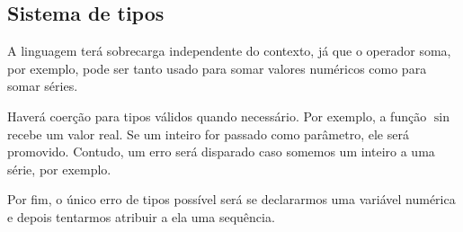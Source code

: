 \documentclass[a4 paper, 12pt]{article}
\begin{document}
\subsection{Sistema de tipos}
A linguagem ter\'a sobrecarga independente do contexto, j\'a que o
operador soma, por exemplo, pode ser tanto usado para somar valores
num\'ericos como para somar s\'eries.

Haver\'a coer\c c\~ao para tipos v\'alidos quando necess\'ario. Por
exemplo, a fun\c c\~ao $\sin$ recebe um valor real. Se um inteiro for
passado como par\^ametro, ele ser\'a promovido. Contudo, um erro
ser\'a disparado caso somemos um inteiro a uma s\'erie, por exemplo.

Por fim, o \'unico erro de tipos poss\'ivel ser\'a se declararmos uma
vari\'avel num\'erica e depois tentarmos atribuir a ela uma
sequ\^encia.
\end{document}
